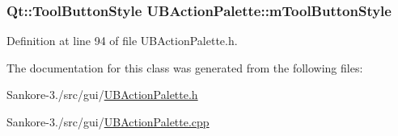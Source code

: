 \hypertarget{class_u_b_action_palette_a8db1c682386ed21c1fdb6773798344ec}{
\subsubsection[{m\-Tool\-Button\-Style}]{\setlength{\rightskip}{0pt plus 5cm}Qt\-::\-Tool\-Button\-Style U\-B\-Action\-Palette\-::m\-Tool\-Button\-Style\hspace{0.3cm}{\ttfamily [protected]}}}\label{de/dc5/class_u_b_action_palette_a8db1c682386ed21c1fdb6773798344ec}


Definition at line 94 of file U\-B\-Action\-Palette.\-h.



The documentation for this class was generated from the following files\-:\begin{DoxyCompactItemize}
\item 
Sankore-\/3./src/gui/\hyperlink{_u_b_action_palette_8h}{U\-B\-Action\-Palette.\-h}\item 
Sankore-\/3./src/gui/\hyperlink{_u_b_action_palette_8cpp}{U\-B\-Action\-Palette.\-cpp}\end{DoxyCompactItemize}
